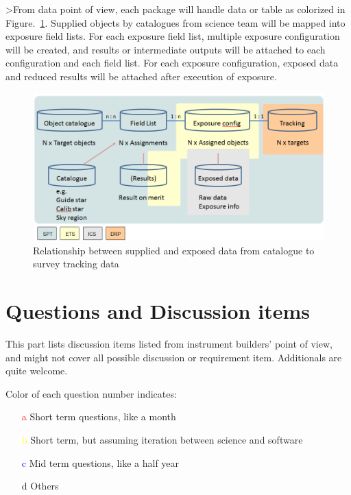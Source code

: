 \documentclass[a4paper,notitlepage]{article}
\newcommand{\cols}[1]{\textcolor{red}{#1}}
\newcommand{\colm}[1]{\textcolor{yellow}{#1}}
\newcommand{\coll}[1]{\textcolor{blue}{#1}}
\begin{document}
>From data point of view, each package will handle data or table as colorized 
in Figure.~\ref{fig:sciops-scireq-slide-data}. 
Supplied objects by catalogues from science team will be mapped into 
exposure field lists. For each exposure field list, multiple exposure 
configuration will be created, and results or intermediate outputs 
will be attached to each configuration and each field list. 
For each exposure configuration, exposed data and reduced results will be 
attached after execution of exposure. 

\begin{figure}[htb]
  \begin{center}
    \includegraphics[width=.75\linewidth]{sciops-scireq-slide-data.png}
  \end{center}
  \caption{Relationship between supplied and exposed data from catalogue to 
    survey tracking data}
  \label{fig:sciops-scireq-slide-data}
\end{figure}



\section{Questions and Discussion items}

This part lists discussion items listed from instrument builders' point 
of view, and might not cover all possible discussion or requirement item. 
Additionals are quite welcome. 

Color of each question number indicates: 
\begin{enumerate}
  \item[\cols{a}] Short term questions, like a month
  \item[\colm{b}] Short term, but assuming iteration between science and software
  \item[\coll{c}] Mid term questions, like a half year
  \item[d] Others
\end{enumerate}
\end{document}
